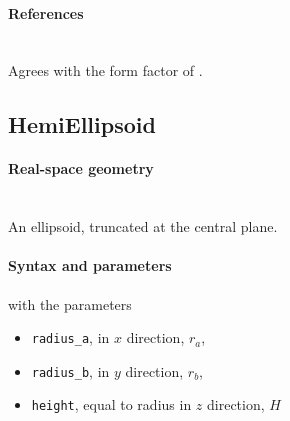 \paragraph{References}\strut\\
Agrees with the  form factor of \IsGISAXS
\cite[Eq.~2.36]{Laz08} \cite[Eq.~226]{ReLL09}.

\clearpage
\subsection{HemiEllipsoid} \label{sec:HemiEllipsoid}  

\paragraph{Real-space geometry}\strut\\
An ellipsoid, truncated at the central plane.

\begin{figure}[h]
\hfill
{}
\hfill
{}
\hfill
\end{figure}

\paragraph{Syntax and parameters}
\begin{quote}
\end{quote}
with the parameters
\begin{itemize}
\item \texttt{radius\_a}, in $x$ direction, $r_a$,
\item \texttt{radius\_b}, in $y$ direction, $r_b$,
\item \texttt{height}, equal to radius in $z$ direction, $H$
\end{itemize}

